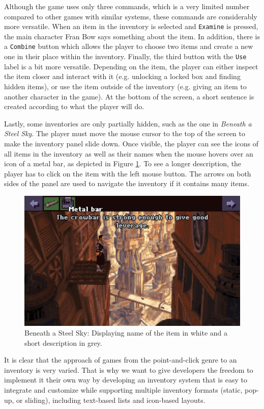 Although the game uses only three commands, which is a very limited number compared to other games with similar systems, these commands are considerably more versatile. When an item in the inventory is selected and \texttt{Examine} is pressed, the main character Fran Bow says something about the item. In addition, there is a \texttt{Combine} button which allows the player to choose two items and create a new one in their place within the inventory. Finally, the third button with the \texttt{Use} label is a bit more versatile. Depending on the item, the player can either inspect the item closer and interact with it (e.g. unlocking a locked box and finding hidden items), or use the item outside of the inventory (e.g. giving an item to another character in the game). At the bottom of the screen, a short sentence is created according to what the player will do.

Lastly, some inventories are only partially hidden, such as the one in \textit{Beneath a Steel Sky}. The player must move the mouse cursor to the top of the screen to make the inventory panel slide down. Once visible, the player can see the icons of all items in the inventory as well as their names when the mouse hovers over an icon of a metal bar, as depicted in Figure \ref{fig:I-BaSS2}. To see a longer description, the player has to click on the item with the left mouse button. The arrows on both sides of the panel are used to navigate the inventory if it contains many items.

\begin{figure}[H]
\centering
\includegraphics[width=.8\linewidth]{img/I-BaSS2.png}
\caption{Beneath a Steel Sky: Displaying name of the item in white and a short description in grey.}
\label{fig:I-BaSS2}
\end{figure}

It is clear that the approach of games from the point-and-click genre to an inventory is very varied. That is why we want to give developers the freedom to implement it their own way by developing an inventory system that is easy to integrate and customize while supporting multiple inventory formats (static, pop-up, or sliding), including text-based lists and icon-based layouts. 

